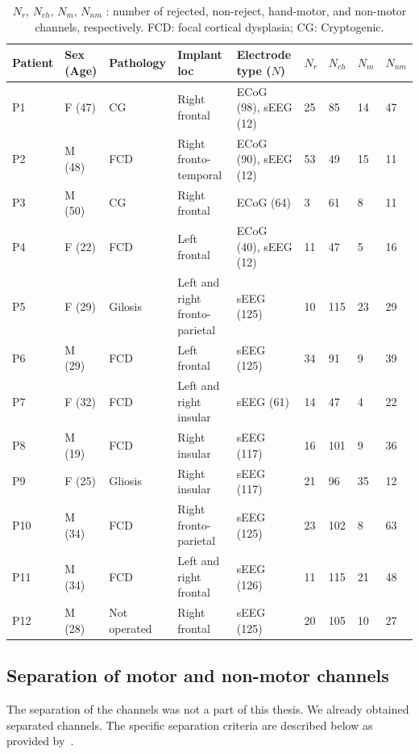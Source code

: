 \begin{table}[!htbp]
\centering
\begin{tabular}{|p{1.25cm}|p{0.95cm}|p{1.75cm}|p{1.65cm}|p{1.65cm}|p{0.5cm}|p{0.65cm}|p{0.6cm}|p{0.8cm}|}
\toprule
Patient&Sex (Age)&Pathology&Implant loc&Electrode type ($N$) & $N_r$ & $N_{ch}$ & $N_{m}$ & $N_{nm}$ \\
\hline
\midrule
P1 & F (47) & CG & Right frontal & ECoG (98),  sEEG (12) & 25 & 85 & 14 & 47 \\
\hline
P2 & M (48) & FCD & Right fronto-temporal & ECoG (90), sEEG (12) & 53 & 49 & 15 & 11 \\
\hline
P3 & M (50) & CG & Right frontal & ECoG (64) & 3 & 61 & 8 & 11 \\
\hline
P4 & F (22) & FCD & Left frontal & ECoG (40),  sEEG (12) & 11 & 47 & 5 & 16 \\
\hline
P5 & F (29) & Gilosis & Left and right fronto-parietal &  sEEG (125) & 10 & 115 & 23 & 29 \\
\hline
P6 & M (29) & FCD & Left frontal &  sEEG (125) & 34 & 91 & 9 & 39 \\
\hline
P7 & F (32) & FCD & Left and right insular &  sEEG (61) & 14 & 47 & 4 & 22 \\
\hline
P8 & M (19) & FCD & Right insular &  sEEG (117) & 16 & 101 & 9 & 36 \\
\hline
P9 & F (25) & Gliosis & Right insular &  sEEG (117) & 21 & 96 & 35 & 12 \\
\hline
P10 & M (34) & FCD & Right fronto-parietal &  sEEG (125) & 23 & 102 & 8 & 63 \\
\hline
P11 & M (34) & FCD & Left and right frontal &  sEEG (126) & 11 & 115 & 21 & 48 \\
\hline
P12 & M (28) & Not operated & Right frontal &  sEEG (125) & 20 & 105 & 10 & 27 \\
\bottomrule
\end{tabular}
\caption[Patient details]{$N_r$, $N_{ch}$, $N_{m}$, $N_{nm}$  : number of rejected, non-reject, hand-motor, and non-motor channels, respectively. FCD: focal cortical dysplasia; CG: Cryptogenic.}
\label{tab:patient-table}
\end{table}

\subsection{Separation of motor and non-motor channels}\label{subsec:separation-of-motor-and-non-motor-channels}
The separation of the channels was not a part of this thesis. 
We already obtained separated channels.
The specific separation criteria are described below as provided by~\cite{Hammer-2021}. \\

